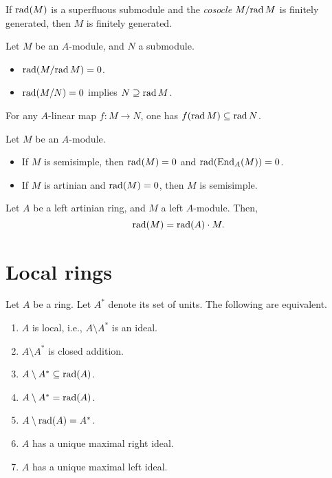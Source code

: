 \documentclass[12pt]{article}
\begin{document}
\begin{thm}
	If $\operatorname{rad}(M)$ is a superfluous submodule and the \emph{cosocle} $M/{\operatorname{rad} M}$ is finitely generated, then $M$ is finitely generated.
\end{thm}

\begin{thm}
	Let $M$ be an $A$-module, and $N$ a submodule.
	\begin{itemize}
		\item $\operatorname{rad}(M/{\operatorname{rad} M}) = 0$.
		\item $\operatorname{rad}(M/N) = 0$ implies $N \supseteq \operatorname{rad} M$.
	\end{itemize}
\end{thm}

\begin{thm}
	For any $A$-linear map $f \colon M \to N$, one has $f(\operatorname{rad} M) \subseteq \operatorname{rad} N$.
\end{thm}

\begin{thm} \label{thm:radical-and-semisimplicity}
	Let $M$ be an $A$-module.
	\begin{itemize}
		\item If $M$ is semisimple, then $\operatorname{rad}(M) = 0$ and $\operatorname{rad}(\operatorname{End}_{A}(M)) = 0$.
		\item If $M$ is artinian and $\operatorname{rad}(M) = 0$, then $M$ is semisimple.
	\end{itemize}
\end{thm}

\begin{thm}
	Let $A$ be a left artinian ring, and $M$ a left $A$-module. 
	Then,
	\begin{equation*} 
		\operatorname{rad}(M) = \operatorname{rad}(A) \cdot M.
	\end{equation*}
\end{thm}

\section{Local rings}

\begin{thm}
	Let $A$ be a ring. Let $A^{\ast}$ denote its set of units. The following are equivalent.
	\begin{enumerate}[label=(\alph*)]
		\item $A$ is local, i.e., $A \setminus A^{\ast}$ is an ideal.
		\item $A \setminus A^{\ast}$ is closed addition.
		\item $A \setminus A^{\ast} \subseteq \operatorname{rad}(A)$.
		\item $A \setminus A^{\ast} = \operatorname{rad}(A)$.
		\item $A \setminus \operatorname{rad}(A) = A^{\ast}$.
		\item $A$ has a unique maximal right ideal.
		\item $A$ has a unique maximal left ideal.
	\end{enumerate}
\end{thm}
\end{document}
